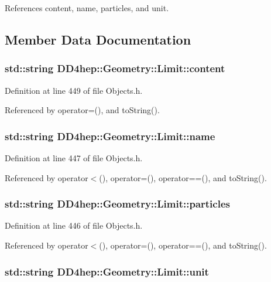 References content, name, particles, and unit.

\subsection{Member Data Documentation}
\hypertarget{class_d_d4hep_1_1_geometry_1_1_limit_aafcf490f74d6001a5dde9d9c6061e694}{
\subsubsection[{content}]{\setlength{\rightskip}{0pt plus 5cm}std::string {\bf DD4hep::Geometry::Limit::content}}}
\label{class_d_d4hep_1_1_geometry_1_1_limit_aafcf490f74d6001a5dde9d9c6061e694}


Definition at line 449 of file Objects.h.

Referenced by operator=(), and toString().\hypertarget{class_d_d4hep_1_1_geometry_1_1_limit_ad1cec0ce58b0158ef8ba97d0a066cb28}{
\subsubsection[{name}]{\setlength{\rightskip}{0pt plus 5cm}std::string {\bf DD4hep::Geometry::Limit::name}}}
\label{class_d_d4hep_1_1_geometry_1_1_limit_ad1cec0ce58b0158ef8ba97d0a066cb28}


Definition at line 447 of file Objects.h.

Referenced by operator$<$(), operator=(), operator==(), and toString().\hypertarget{class_d_d4hep_1_1_geometry_1_1_limit_a44351a38f5e876a67898568c5ca4d4a6}{
\subsubsection[{particles}]{\setlength{\rightskip}{0pt plus 5cm}std::string {\bf DD4hep::Geometry::Limit::particles}}}
\label{class_d_d4hep_1_1_geometry_1_1_limit_a44351a38f5e876a67898568c5ca4d4a6}


Definition at line 446 of file Objects.h.

Referenced by operator$<$(), operator=(), operator==(), and toString().\hypertarget{class_d_d4hep_1_1_geometry_1_1_limit_a60bf4c5f1e2847c0dde17d54abaffffb}{
\subsubsection[{unit}]{\setlength{\rightskip}{0pt plus 5cm}std::string {\bf DD4hep::Geometry::Limit::unit}}}
\label{class_d_d4hep_1_1_geometry_1_1_limit_a60bf4c5f1e2847c0dde17d54abaffffb}


